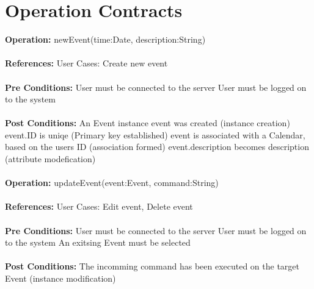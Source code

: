 \documentclass[a4paper,10pt,titlepage]{article}
\begin{document}
\section{Operation Contracts}
	\textbf{Operation:}	newEvent(time:Date, description:String)
	\\ \\
	\textbf{References:}	User Cases:	Create new event
	\\ \\
	\textbf{Pre Conditions:}		
						User must be connected to the server
						User must be logged on to the system
					\\ \\
	\textbf{Post Conditions:}	
						An Event instance event was created (instance creation)
						event.ID is uniqe (Primary key established)
						event is associated with a Calendar, based on the users ID (association formed)
						event.description becomes description (attribute modefication)	
					\\ \\	
	\textbf{Operation:}	updateEvent(event:Event, command:String)
	\\ \\
	\textbf{References:}	User Cases:	Edit event, Delete event
	\\ \\
	\textbf{Pre Conditions:}
						User must be connected to the server
						User must be logged on to the system
						An exitsing Event must be selected
	\\ \\	
	\textbf{Post Conditions:}
						The incomming command has been executed on the target Event (instance modification)
						
						


	
	
	
	
\end{document}
